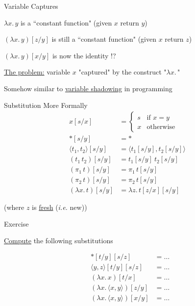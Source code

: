 \documentclass{beamer}
\def\pv#1#2{\langle #1 \rangle #2}
\begin{document}
\begin{frame}{Variable Captures}

        $\lambda x. \, y$ is a ``constant function" (given $x$ return $y$)

        \pause
        $(\lambda x. \, y)[z/y]$ is still a ``constant function" (given $x$ return $z$)

        \pause
        $(\lambda x. \, y) [x/y]$ is now the identity !?

        \pause
        \bigskip
        \bigskip
        \alert{\underline{The problem:}} variable $x$ "captured" by the construct "$\lambda x. \,$"

        Somehow similar to \alert{\underline{variable shadowing}} in programming
\end{frame}

\begin{frame}{Substitution More Formally}
        \begin{align*}
                x[s/x] & = 
                \begin{cases}
                        s & \text{if } x = y \\
                        x & \text{otherwise}
                \end{cases}
                \\
                \ast[s/y] & = \ast
                \\
                \pv{t_1,t_2}[s/y] & = \pv{t_1[s/y], t_2[s/y]}
                \\
                (t_1 \, t_2)[s/y] & = t_1[s/y] \> t_2[s/y]
                \\
                (\pi_1 \, t)[s/y] & = \pi_1 \, t[s/y] 
                \\
                (\pi_2 \, t)[s/y] & = \pi_2 \, t[s/y] 
                \\
                (\lambda x. \, t)[s/y] & = 
                        \lambda z. \, t[z/x][s/y]
        \end{align*}

        \begin{center}
                (where $z$ is \alert{\underline{fresh}} (\emph{i.e.} new))
        \end{center}
\end{frame}

\begin{frame}{Exercise}

        \alert{\underline{Compute}} the following substitutions

         \begin{align*}
                & \ast[t/y][s/z] &  = \dots 
                \\
                & \pv{y,z}[t/y][s/z] & = \dots 
                \\
                & (\lambda x. \, x) [t/x]  & = \dots
                \\
                & (\lambda x. \, \pv{x,y})[z/y] & = \dots
                \\
                &  (\lambda x. \, \pv{x,y})[x/y] & = \dots
        \end{align*}
\end{frame}
\end{document}
